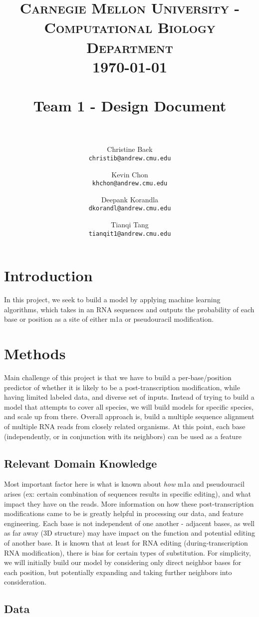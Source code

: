 \documentclass[paper=a4, fontsize=11pt]{scrartcl}
\title{
    \usefont{OT1}{bch}{b}{n}
    \normalfont \normalsize \textsc{Carnegie Mellon University - Computational Biology Department} \\ [25pt]
    \today \\
    \horrule{0.5pt} \\[0.4cm]
    \huge Team 1 - Design Document\\
    \horrule{2pt} \\[0.5cm]
}
\author{
  Christine Baek\\
  \normalsize\texttt{christib@andrew.cmu.edu}
  \and
  Kevin Chon\\
  \normalsize\texttt{khchon@andrew.cmu.edu}
  \and
  Deepank Korandla\\
  \normalsize\texttt{dkorandl@andrew.cmu.edu}
   \and
  Tianqi Tang\\
  \normalsize\texttt{tianqit1@andrew.cmu.edu}
  \date{}
}
\date{}
\numberwithin{equation}{section}    %
\numberwithin{figure}{section}      %
\numberwithin{table}{section}       %
\numberwithin{equation}{section}    %
\numberwithin{figure}{section}      %
\numberwithin{table}{section}       %
\begin{document}
\maketitle
\section{Introduction}
In this project, we seek to build a model by applying machine learning algorithms, which takes in an RNA sequences and outputs the probability of each base or position as a site of either m1a or pseudouracil modification. 


\section{Methods}

Main challenge of this project is that we have to build a per-base/position predictor of whether it is likely to be a post-transcription modification, while having limited labeled data, and diverse set of inputs. Instead of trying to build a model that attempts to cover all species, we will build models for specific species, and scale up from there. Overall approach is, build a multiple sequence alignment of multiple RNA reads from closely related organisms. At this point, each base (independently, or in conjunction with its neighbors) can be used as a feature

\subsection{Relevant Domain Knowledge}

Most important factor here is what is known about \textit{how} m1a and pseudouracil arises (ex: certain combination of sequences results in specific editing), and what impact they have on the reads. 
More information on how these post-transcription modifications came to be is greatly helpful in processing our data, and feature engineering. 
Each base is not independent of one another - adjacent bases, as well as far away (3D structure) may have impact on the function and potential editing of another base. It is known that at least for RNA editing (during-transcription RNA modification), there is bias for certain types of substitution. For simplicity, we will initially build our model by considering only direct neighbor bases for each position, but potentially expanding and taking further neighbors into consideration.


\subsection{Data}
\end{document}

